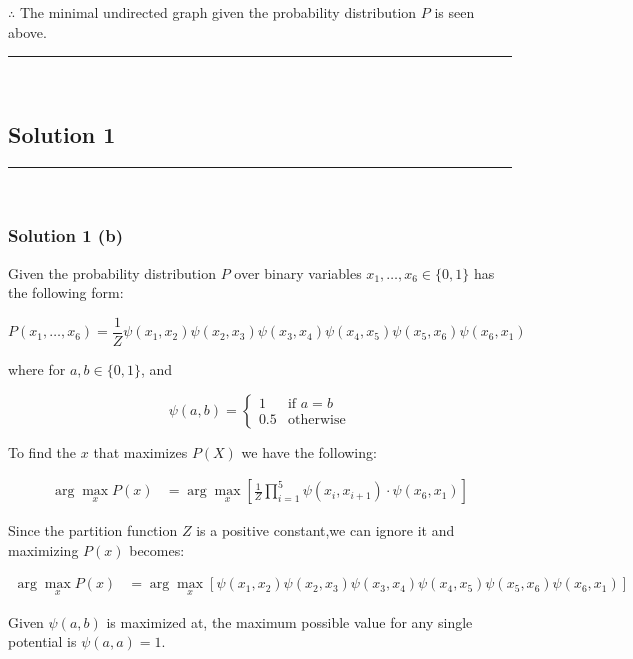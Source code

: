 \documentclass{article}
\begin{document}
\subsubsection*{\normalfont}{$\therefore$ The minimal undirected graph given the probability distribution $P$ is seen above.}

\noindent\rule{\textwidth}{0.4pt}\\

\newpage

\subsection*{Solution 1}
\noindent\rule{\textwidth}{0.4pt}\\
\subsubsection*{Solution 1 (b)}
\begin{flushleft}
    Given the probability distribution $P$ over binary variables $x_1, \ldots, x_6 \in \{0, 1\}$ has the following form:
\end{flushleft}
$$
P(x_1, \ldots, x_6) = \frac{1}{Z} \psi(x_1, x_2)\psi(x_2, x_3)\psi(x_3, x_4)\psi(x_4, x_5)\psi(x_5, x_6)\psi(x_6, x_1)
$$
\begin{flushleft}
    where for $a, b \in \{0, 1\}$, and
\end{flushleft}
$$
\psi(a, b) = \begin{cases}
1 & \text{if } a = b\\
0.5 & \text{otherwise}
\end{cases}
$$
\begin{flushleft}
    To find the $x$ that maximizes $P(X)$ we have the following:
\end{flushleft}
\begin{align*}
    \arg\max_{x} P(x) &= \arg\max_{x} \left[ \frac{1}{Z} \prod_{i=1}^{5} \psi(x_i, x_{i+1}) \cdot \psi(x_6, x_1) \right]
\end{align*}
\begin{flushleft}
    Since the partition function $Z$ is a positive constant,we can ignore it and maximizing $P(x)$ becomes:
\end{flushleft}
\begin{align*}
    \arg\max_{x} P(x) &= \arg\max_{x} \left[ \psi(x_1, x_2)\psi(x_2, x_3)\psi(x_3, x_4)\psi(x_4, x_5)\psi(x_5, x_6)\psi(x_6, x_1) \right]
\end{align*}
\begin{flushleft}
    Given $\psi(a,b)$ is maximized at, the maximum possible value for any single potential is $\psi(a, a) = 1$.
\end{flushleft}
\end{document}
